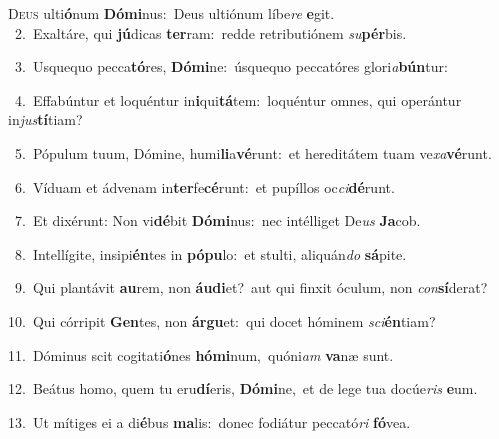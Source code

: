 \lettrine{\initial\textcolor{\initialcolor}{D}}{eus} ulti\-\textbf{ó}\-num \textbf{Dó}\-\textbf{mi}nus:~\star Deus ultiónum líbe\textit{re} \textbf{e}\-git.\\
{\numbfont\textcolor{\numbcolor}{~2.}}~Exaltáre, qui \textbf{jú}\-dicas \textbf{ter}\-ram:~\star redde retributiónem \textit{su}\-\textbf{pér}bis.\par
{\numbfont\textcolor{\numbcolor}{~3.}}~Usquequo pecca\-\textbf{tó}\-res, \textbf{Dó}\-\textbf{mi}ne:~\star úsquequo peccatóres glori\-\textit{a}\-\textbf{bún}tur:\par
{\numbfont\textcolor{\numbcolor}{~4.}}~Effabúntur et loquéntur in\-\textbf{i}\-qui\-\textbf{tá}\-tem:~\star loquéntur omnes, qui operántur in\-\textit{jus}\-\textbf{tí}tiam?\par
{\numbfont\textcolor{\numbcolor}{~5.}}~Pópulum tuum, Dómine, humi\-\textbf{li}\-a\-\textbf{vé}\-runt:~\star et hereditátem tuam ve\-\textit{xa}\-\textbf{vé}runt.\par
{\numbfont\textcolor{\numbcolor}{~6.}}~Víduam et ádvenam in\-\textbf{ter}\-fe\-\textbf{cé}\-runt:~\star et pupíllos oc\-\textit{ci}\-\textbf{dé}runt.\par
{\numbfont\textcolor{\numbcolor}{~7.}}~Et dixérunt: Non vi\-\textbf{dé}\-bit \textbf{Dó}\-\textbf{mi}nus:~\star nec intélliget De\textit{us} \textbf{Ja}\-cob.\par
{\numbfont\textcolor{\numbcolor}{~8.}}~Intellígite, insipi\-\textbf{én}\-tes in \textbf{pó}\-\textbf{pu}lo:~\star et stulti, aliquán\textit{do} \textbf{sá}\-pite.\par
{\numbfont\textcolor{\numbcolor}{~9.}}~Qui plantávit \textbf{au}\-rem, non \textbf{áu}\-\textbf{di}et?~\star aut qui finxit óculum, non \textit{con}\-\textbf{sí}derat?\par
{\numbfont\textcolor{\numbcolor}{10.}}~Qui córripit \textbf{Gen}\-tes, non \textbf{ár}\-\textbf{gu}et:~\star qui docet hóminem \textit{sci}\-\textbf{én}tiam?\par
{\numbfont\textcolor{\numbcolor}{11.}}~Dóminus scit cogitati\-\textbf{ó}\-nes \textbf{hó}\-\textbf{mi}num,~\star quóni\textit{am} \textbf{va}\-næ sunt.\par
{\numbfont\textcolor{\numbcolor}{12.}}~Beátus homo, quem tu eru\-\textbf{dí}\-eris, \textbf{Dó}\-\textbf{mi}ne,~\star et de lege tua docúe\textit{ris} \textbf{e}\-um.\par
{\numbfont\textcolor{\numbcolor}{13.}}~Ut mítiges ei a di\-\textbf{é}\-bus \textbf{ma}\-lis:~\star donec fodiátur peccató\textit{ri} \textbf{fó}\-vea.\par
